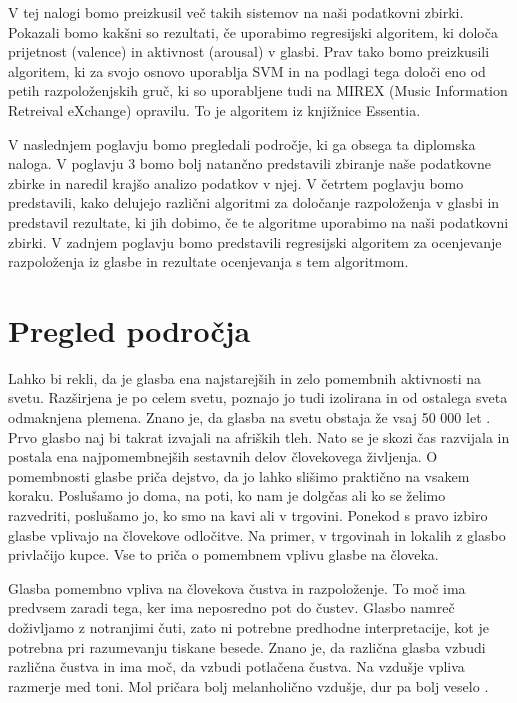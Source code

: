 \documentclass[a4paper, 12pt]{book}
\begin{document}
{V tej nalogi bomo preizkusil več takih sistemov na naši podatkovni zbirki. Pokazali bomo kakšni so rezultati, če uporabimo regresijski algoritem, ki določa prijetnost (valence) in aktivnost (arousal) v glasbi. Prav tako bomo preizkusili algoritem, ki za svojo osnovo uporablja SVM in na podlagi tega določi eno od petih razpoloženjskih gruč, ki so uporabljene tudi na MIREX (Music Information Retreival eXchange) opravilu. To je algoritem iz knjižnice Essentia.

V naslednjem poglavju bomo pregledali področje, ki ga obsega ta diplomska naloga. V poglavju 3 bomo bolj natančno predstavili zbiranje naše podatkovne zbirke in naredil krajšo analizo podatkov v njej. V četrtem poglavju bomo predstavili, kako delujejo različni algoritmi za določanje razpoloženja v glasbi in predstavil rezultate, ki jih dobimo, če te algoritme uporabimo na naši podatkovni zbirki. V zadnjem poglavju bomo predstavili regresijski algoritem za ocenjevanje razpoloženja iz glasbe in rezultate ocenjevanja s tem algoritmom.

\chapter{Pregled področja}

Lahko bi rekli, da je glasba ena najstarejših in zelo pomembnih aktivnosti na svetu. Razširjena je po celem svetu, poznajo jo tudi izolirana in od ostalega sveta odmaknjena plemena. Znano je, da glasba na svetu obstaja že vsaj 50 000 let \cite{Krause2012}. Prvo glasbo naj bi takrat izvajali na afriških tleh. Nato se je skozi čas razvijala in postala ena najpomembnejših sestavnih delov človekovega življenja. O pomembnosti glasbe priča dejstvo, da jo lahko slišimo praktično na vsakem koraku. Poslušamo jo doma, na poti, ko nam je dolgčas ali ko se želimo razvedriti, poslušamo jo, ko smo na kavi ali v trgovini. Ponekod s pravo izbiro glasbe vplivajo na človekove odločitve. Na primer, v trgovinah in lokalih z glasbo privlačijo kupce. Vse to priča o pomembnem vplivu glasbe na človeka.  

Glasba pomembno vpliva na človekova čustva in razpoloženje. To moč ima predvsem zaradi tega, ker ima neposredno pot do čustev. Glasbo namreč do\-živ\-lja\-mo z notranjimi čuti, zato ni potrebne predhodne interpretacije, kot je potrebna pri razumevanju tiskane besede.  Znano je, da različna glasba vzbudi različna čustva in ima moč, da vzbudi potlačena čustva. Na vzdušje vpliva razmerje med toni. Mol pričara bolj melanholično vzdušje, dur pa bolj veselo \cite{lenko2009pomen}.

}
\end{document}
